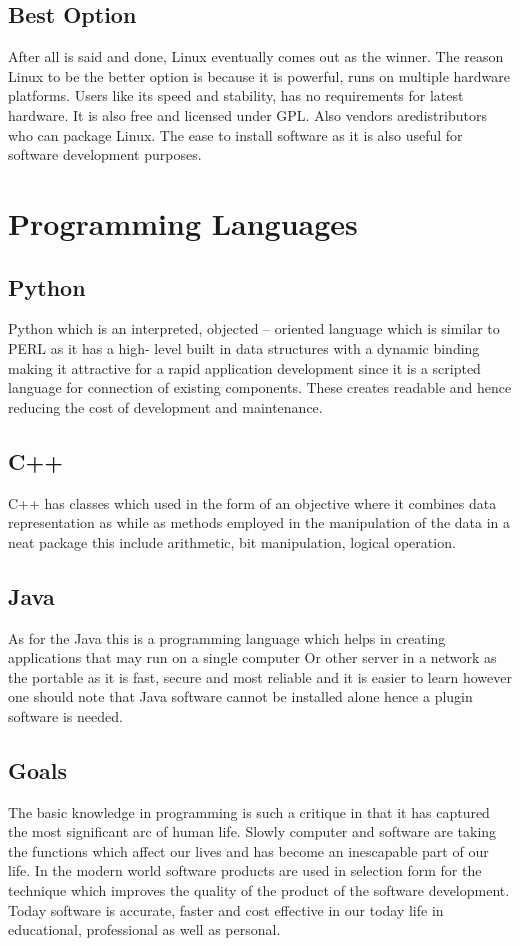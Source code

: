 \subsection{Best Option}
After all is said and done, Linux eventually comes out as the winner. The reason Linux to be the better
option is because it is powerful, runs on multiple hardware platforms. Users like its speed and stability,
has no requirements for latest hardware. It is also free and licensed under GPL. Also vendors aredistributors who can package Linux. The ease to install software as it is also useful for software
development purposes.


\section{Programming Languages}

\subsection{Python}
Python which is an interpreted, objected – oriented language which is similar to PERL as it has a high-
level built in data structures with a dynamic binding making it attractive for a rapid application
development since it is a scripted language for connection of existing components. These creates
readable and hence reducing the cost of development and maintenance.

\subsection{C++}
C++ has classes which used in the form of an objective where it combines data representation as while
as methods employed in the manipulation of the data in a neat package this include arithmetic, bit
manipulation, logical operation.

\subsection{Java}
As for the Java this is a programming language which helps in creating applications that may run on a
single computer Or other server in a network as the portable as it is fast, secure and most reliable and it
is easier to learn however one should note that Java software cannot be installed alone hence a plugin
software is needed.

\subsection{Goals}
The basic knowledge in programming is such a critique in that it has captured the most significant arc of
human life. Slowly computer and software are taking the functions which affect our lives and has
become an inescapable part of our life. In the modern world software products are used in selection
form for the technique which improves the quality of the product of the software development. Today
software is accurate, faster and cost effective in our today life in educational, professional as well as
personal.

